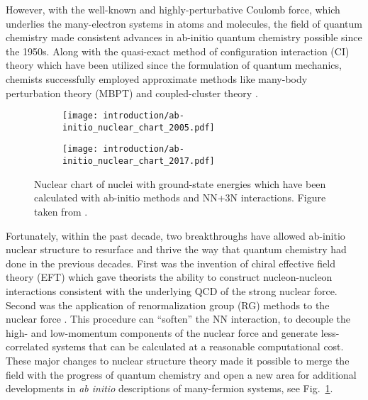 \documentclass[../thesis.tex]{subfiles}
\begin{document}
However, with the well-known and highly-perturbative Coulomb force, which underlies the many-electron systems in atoms and molecules, the field of quantum chemistry made consistent advances in ab-initio quantum chemistry possible since the 1950s.  Along with the quasi-exact method of configuration interaction (CI) theory \cite{SLATER19291293,CONDON19301121,BACHER1933264,UFFORD1933732} which have been utilized since the formulation of quantum mechanics, chemists successfully employed approximate methods like many-body perturbation theory (MBPT) \cite{HUBBARD1957539,HUGENHOLTZ1957481,SCHAEFER1984,SHAVITT2009} and coupled-cluster theory \cite{CIZEK19664256,CIZEK1971359,CIZEK1980251,PIECUCH2002527,SHAVITT2009}.

\begin{figure}[h]
  \centering
  \begin{subfigure}{0.7\textwidth}
    \centering
    \texttt{[image: introduction/ab-initio\_nuclear\_chart\_2005.pdf]}
  \end{subfigure}
  
  \begin{subfigure}{0.7\textwidth}
    \centering
    \texttt{[image: introduction/ab-initio\_nuclear\_chart\_2017.pdf]}
  \end{subfigure}
  \caption{Nuclear chart of nuclei with ground-state energies which have been calculated with ab-initio methods and NN+3N interactions.  Figure taken from \cite{HERGERTPRIVATE}.}
  \label{fig:AbInitioChart}
\end{figure}

Fortunately, within the past decade, two breakthroughs have allowed ab-initio nuclear structure to resurface and thrive the way that quantum chemistry had done in the previous decades.  First was the invention of chiral effective field theory (EFT) \cite{EPELBAUM20091773,MACHLEIDT20111} which gave theorists the ability to construct nucleon-nucleon interactions consistent with the underlying QCD of the strong nuclear force.  Second was the application of renormalization group (RG) methods to the nuclear force \cite{BOGNER201094,ROTH2011072501}.  This procedure can ``soften'' the NN interaction, to decouple the high- and low-momentum components of the nuclear force and generate less-correlated systems that can be calculated at a reasonable computational cost.  These major changes to nuclear structure theory made it possible to merge the field with the progress of quantum chemistry and open a new area for additional developments in \emph{ab initio} descriptions of many-fermion systems, see Fig.\ \ref{fig:AbInitioChart}.
\end{document}
